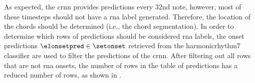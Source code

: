 
As expected, the \gls{crnn} provides predictions every
\gls{32nd} note, however, most of these timesteps should not
have a \gls{rna} label generated. Therefore, the location of
the chords should be determined (i.e., the chord
segmentation). In order to determine which rows of
predictions should be considered \gls{rna} labels, the onset
predictions $\elonsetpred \in \setonset$ retrieved from the
\gls{harmonicrhythm7} classifier are used to filter the
predictions of the \gls{crnn}. After filtering out all rows
that are not \gls{rna} onsets, the number of rows in the
table of predictions has a reduced number of rows, as shown
in .


